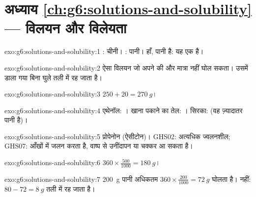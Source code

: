 \section*{अध्याय \ref{ch:g6:solutions-and-solubility} --- विलयन और विलेयता}

\begin{solution}{exo:g6:solutions-and-solubility:1}
: चीनी। : पानी। हाँ,  पानी है: यह एक
 है।
\end{solution}

\begin{solution}{exo:g6:solutions-and-solubility:2}
ऐसा विलयन जो अपने  की और मात्रा नहीं घोल सकता। उसमें डाला गया 
बिना घुले तली में रह जाता है।
\end{solution}

\begin{solution}{exo:g6:solutions-and-solubility:3}
$250 + 20 = \qty{270}{g}$।
\end{solution}

\begin{solution}{exo:g6:solutions-and-solubility:4}
एथेनॉल: । खाना पकाने का तेल: । सिरका:  (वह
ज़्यादातर पानी है)।
\end{solution}

\begin{solution}{exo:g6:solutions-and-solubility:5}
प्रोपेनोन (ऐसीटोन)। GHS02: अत्यधिक ज्वलनशील; GHS07: आँखों में जलन करता है,
वाष्प से उनींदापन या चक्कर आ सकता है।
\end{solution}

\begin{solution}{exo:g6:solutions-and-solubility:6}
$360 \times \frac{500}{1000} = \qty{180}{g}$।
\end{solution}

\begin{solution}{exo:g6:solutions-and-solubility:7}
\qty{200}{g} पानी अधिकतम $360 \times \frac{200}{1000} =
\qty{72}{g}$ घोलता है। नहीं: $80 - 72 = \qty{8}{g}$ तली में रह जाता है।
\end{solution}

